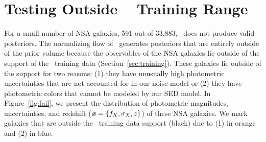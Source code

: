 \section{Testing Outside \sedflow~ Training Range} \label{sec:fail}
For a small number of NSA galaxies, 591 out of 33,883, \sedflow~does not
produce valid posteriors. 
The normalizing flow of \sedflow~generates posteriors that are entirely outside
of the prior volume because the observables of the NSA galaxies lie outside of
the support of the \sedflow~training data (Section~\ref{sec:training}). 
These galaxies lie outside of the support for two reasons: 
(1) they have unusually high photometric uncertainties that are not accounted
for in our noise model or 
(2) they have photometric colors that cannot be modeled by our SED model. 
In Figure~\ref{fig:fail}, we present the distribution of photometric
magnitudes, uncertainties, and redshift ($\textbf{\textit{x}} = \{f_X, \sigma_X, z\}$) of
these NSA galaxies. 
We mark galaxies that are outside the \sedflow~training data support (black)
due to (1) in orange and (2) in blue. 

